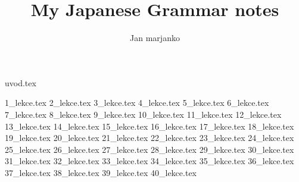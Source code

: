 \documentclass[article]{jlreq}
\title{My Japanese Grammar notes}
\author{Jan marjanko}
\begin{document}
\maketitle
\newpage
{uvod.tex}
\newpage
\tableofcontents
\newpage

{1_lekce.tex}%
{2_lekce.tex}%
{3_lekce.tex}%
{4_lekce.tex}%
{5_lekce.tex} %
{6_lekce.tex}%
{7_lekce.tex}%
{8_lekce.tex}%
{9_lekce.tex}%
{10_lekce.tex}%
{11_lekce.tex}%
{12_lekce.tex}%
{13_lekce.tex}%
{14_lekce.tex}%
{15_lekce.tex}%
{16_lekce.tex}%
{17_lekce.tex}%
{18_lekce.tex}%
{19_lekce.tex}%
{20_lekce.tex}%
{21_lekce.tex}%
{22_lekce.tex}%
{23_lekce.tex}%
{24_lekce.tex}
{25_lekce.tex}%
{26_lekce.tex}%
{27_lekce.tex}%
{28_lekce.tex}%
{29_lekce.tex}%
{30_lekce.tex}%
{31_lekce.tex}%
{32_lekce.tex}%
{33_lekce.tex}%
{34_lekce.tex}%
{35_lekce.tex}%
{36_lekce.tex}%
{37_lekce.tex}%
{38_lekce.tex}%
{39_lekce.tex}%
{40_lekce.tex}%
\end{document}
